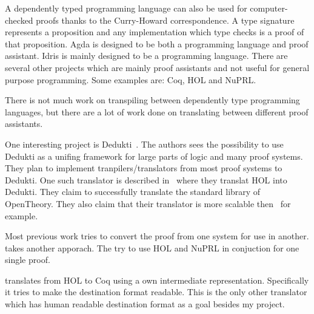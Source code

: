 A dependently typed programming language can also be used for computer-checked
proofs thanks to the Curry-Howard correspondence. A type signature represents
a proposition and any implementation which type checks is a proof of that
proposition. Agda is designed to be both a programming language and proof
assistant. Idris is mainly designed to be a programming language. There are
several other projects which are mainly proof assistants and not useful for
general purpose programming. Some examples are: Coq, HOL and NuPRL.

There is not much work on transpiling between dependently type programming
languages, but there are a lot of work done on translating between different
proof assistants.

One interesting project is Dedukti~\cite{assaf2016dedukti}. The authors sees
the possibility to use Dedukti as a unifing framework for large parts of logic
and many proof systems. They plan to implement tranpilers/translators from most
proof systems to Dedukti. One such translator is described
in~\cite{assaf2015translating} where they translat HOL into Dedukti. They claim
to successfully translate the standard library of OpenTheory. %
They also claim that their translator is more scalable
then~\cite{obua2006importing} for example.

Most previous work tries to convert the proof from one system for use in
another. \cite{felty1997hybrid} takes another apporach. The try to use HOL and
NuPRL in conjuction for one single proof.

\cite{denney2000prototype} translates from HOL to Coq using a own intermediate
representation. Specifically it tries to make the destination format readable.
This is the only other translator which has human readable destination format
as a goal besides my project.


